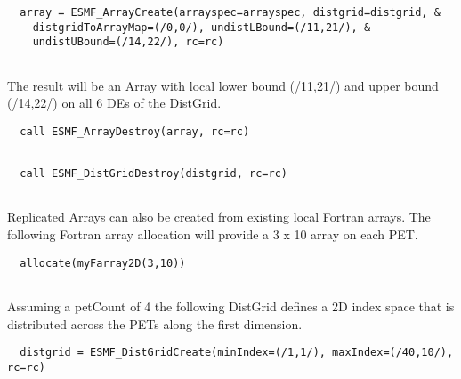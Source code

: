  \begin{verbatim}
  array = ESMF_ArrayCreate(arrayspec=arrayspec, distgrid=distgrid, &
    distgridToArrayMap=(/0,0/), undistLBound=(/11,21/), &
    undistUBound=(/14,22/), rc=rc)
 
\end{verbatim}
 

   The result will be an Array with local lower bound (/11,21/) and upper bound
   (/14,22/) on all 6 DEs of the DistGrid. 

 \begin{verbatim}
  call ESMF_ArrayDestroy(array, rc=rc)
 
\end{verbatim}
 

 \begin{verbatim}
  call ESMF_DistGridDestroy(distgrid, rc=rc)
 
\end{verbatim}
 

   Replicated Arrays can also be created from existing local Fortran arrays.
   The following Fortran array allocation will provide a 3 x 10 array on each
   PET.  

 \begin{verbatim}
  allocate(myFarray2D(3,10))
 
\end{verbatim}
 

   Assuming a petCount of 4 the following DistGrid defines a 2D index space
   that is distributed across the PETs along the first dimension. 

 \begin{verbatim}
  distgrid = ESMF_DistGridCreate(minIndex=(/1,1/), maxIndex=(/40,10/), rc=rc)
 
\end{verbatim}
 


